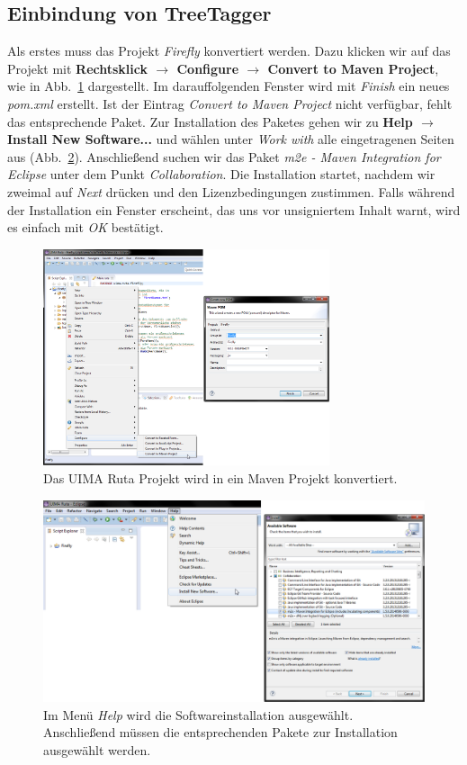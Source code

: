 \documentclass{article}
\begin{document}
\subsection{Einbindung von TreeTagger}
Als erstes muss das Projekt \textit{Firefly} konvertiert werden. Dazu klicken wir auf das Projekt mit \textbf{Rechtsklick $\rightarrow$ Configure $\rightarrow$ Convert to Maven Project}, wie in Abb.~\ref{convert} dargestellt. Im darauffolgenden Fenster wird mit \textit{Finish} ein neues \textit{pom.xml} erstellt. Ist der Eintrag \textit{Convert to Maven Project} nicht verfügbar, fehlt das entsprechende Paket. Zur Installation des Paketes gehen wir zu \textbf{Help $\rightarrow$ Install New Software...} und wählen unter \textit{Work with} alle eingetragenen Seiten aus (Abb.~\ref{m2e_install}). Anschließend suchen wir das Paket \textit{m2e - Maven Integration for Eclipse} unter dem Punkt \textit{Collaboration}. Die Installation startet, nachdem wir zweimal auf \textit{Next} drücken und den Lizenzbedingungen zustimmen. Falls während der Installation ein Fenster erscheint, das uns vor unsigniertem Inhalt warnt, wird es einfach mit \textit{OK} bestätigt.

\begin{figure}
\centering
\includegraphics[width=0.75\textwidth]{figs/tt_convert.png}
\caption{Das UIMA Ruta Projekt wird in ein Maven Projekt konvertiert.}
\label{convert}
\end{figure}

\begin{figure}
\centering
\includegraphics[width=1\textwidth]{figs/m2e_install.png}
\caption{Im Menü \textit{Help} wird die Softwareinstallation ausgewählt. Anschließend müssen die entsprechenden Pakete zur Installation ausgewählt werden.}
\label{m2e_install}
\end{figure}
\end{document}
